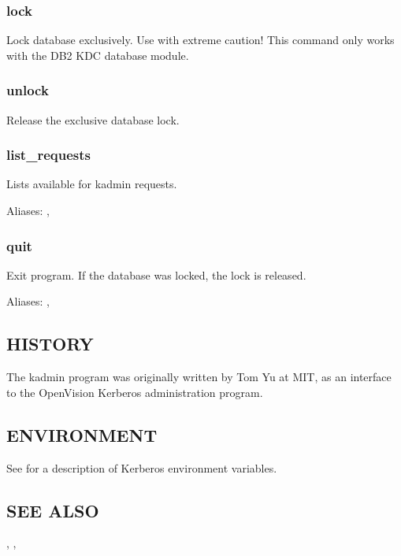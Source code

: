 \documentclass[letterpaper,10pt,english]{sphinxmanual}
\begin{document}
\subsubsection{lock}
\label{\detokenize{admin/admin_commands/kadmin_local:lock}}
\sphinxAtStartPar
Lock database exclusively.  Use with extreme caution!  This command
only works with the DB2 KDC database module.


\subsubsection{unlock}
\label{\detokenize{admin/admin_commands/kadmin_local:unlock}}
\sphinxAtStartPar
Release the exclusive database lock.


\subsubsection{list\_requests}
\label{\detokenize{admin/admin_commands/kadmin_local:list-requests}}
\sphinxAtStartPar
Lists available for kadmin requests.

\sphinxAtStartPar
Aliases: , 


\subsubsection{quit}
\label{\detokenize{admin/admin_commands/kadmin_local:quit}}
\sphinxAtStartPar
Exit program.  If the database was locked, the lock is released.

\sphinxAtStartPar
Aliases: , 


\subsection{HISTORY}
\label{\detokenize{admin/admin_commands/kadmin_local:history}}
\sphinxAtStartPar
The kadmin program was originally written by Tom Yu at MIT, as an
interface to the OpenVision Kerberos administration program.


\subsection{ENVIRONMENT}
\label{\detokenize{admin/admin_commands/kadmin_local:environment}}
\sphinxAtStartPar
See  for a description of Kerberos environment
variables.


\subsection{SEE ALSO}
\label{\detokenize{admin/admin_commands/kadmin_local:see-also}}
\sphinxAtStartPar
{}, {\hyperref[\detokenize{admin/admin_commands/kadmind:kadmind-8}]{}}, 
\end{document}
